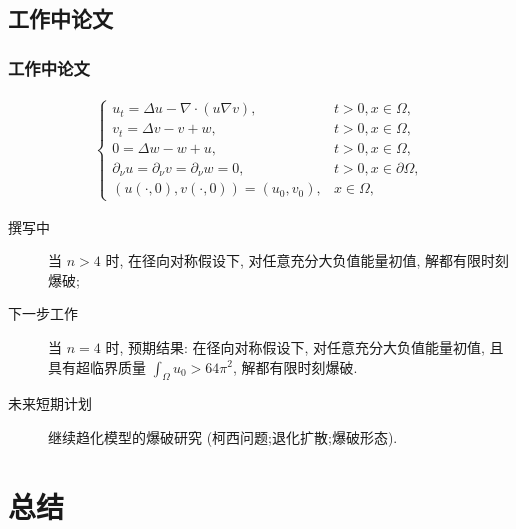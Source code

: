 \subsection{工作中论文}

\begin{frame}
  \frametitle{工作中论文}
  \begin{align}
    \begin{cases}
      \label{sys: ks isp pp/ep/e}
        u_t = \Delta u - \nabla \cdot(u\nabla v),&  t>0, x\in\Omega,\\
        v_t =  \Delta v - v + w,&  t>0, x\in\Omega,	\\
        0  = \Delta w - w + u, &  t > 0, x\in\Omega, \\
        \partial_\nu u = \partial_\nu v = \partial_\nu w = 0 , & t >0, x\in\partial\Omega,\\
        (u(\cdot, 0), v(\cdot, 0)) = (u_0, v_0), & x\in\Omega,
    \end{cases}
  \end{align}
  \begin{description}
    \item [撰写中] 当 $n > 4$ 时, 在径向对称假设下, 对任意充分大负值能量初值, 解都有限时刻爆破;
    \item [下一步工作] 当 $n = 4$ 时, 预期结果: 在径向对称假设下, 对任意充分大负值能量初值, 
    且具有超临界质量 $\int_\Omega u_0 > 64\pi^2$, 解都有限时刻爆破.
    \item [未来短期计划] 继续趋化模型的爆破研究 (柯西问题;退化扩散;爆破形态).
  \end{description}
\end{frame}

\section{总结}

